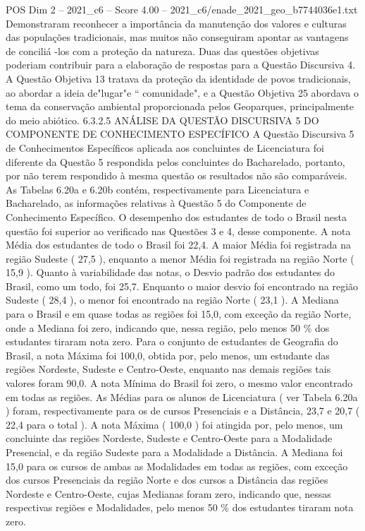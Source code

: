 \begin{textsample}{POS Dim 2 – 2021\_c6 – Score 4.00 – 2021\_c6/enade\_2021\_geo\_b7744036e1.txt}
Demonstraram reconhecer a importância da manutenção dos valores e culturas das populações tradicionais, mas muitos não conseguiram apontar as vantagens de conciliá -los com a proteção da natureza.
Duas das questões objetivas poderiam contribuir para a elaboração de respostas para a Questão Discursiva 4.
A Questão Objetiva 13 tratava da proteção da identidade de povos tradicionais, ao abordar a ideia de"lugar"e “ comunidade", e a Questão Objetiva 25 abordava o tema da conservação ambiental proporcionada pelos Geoparques, principalmente do meio abiótico. 6.3.2.5 ANÁLISE DA QUESTÃO DISCURSIVA 5 DO COMPONENTE DE CONHECIMENTO ESPECÍFICO A Questão Discursiva 5 de Conhecimentos Específicos aplicada aos concluintes de Licenciatura foi diferente da Questão 5 respondida pelos concluintes do Bacharelado, portanto, por não terem respondido à mesma questão os resultados não são comparáveis.
As Tabelas 6.20a e 6.20b contém, respectivamente para Licenciatura e Bacharelado, as informações relativas à Questão 5 do Componente de Conhecimento Específico.
O desempenho dos estudantes de todo o Brasil nesta questão foi superior ao verificado nas Questões 3 e 4, desse componente.
A nota Média dos estudantes de todo o Brasil foi 22,4.
A maior Média foi registrada na região Sudeste ( 27,5 ), enquanto a menor Média foi registrada na região Norte ( 15,9 ).
Quanto à variabilidade das notas, o Desvio padrão dos estudantes do Brasil, como um todo, foi 25,7.
Enquanto o maior desvio foi encontrado na região Sudeste ( 28,4 ), o menor foi encontrado na região Norte ( 23,1 ).
A Mediana para o Brasil e em quase todas as regiões foi 15,0, com exceção da região Norte, onde a Mediana foi zero, indicando que, nessa região, pelo menos 50 \% dos estudantes tiraram nota zero.
Para o conjunto de estudantes de Geografia do Brasil, a nota Máxima foi 100,0, obtida por, pelo menos, um estudante das regiões Nordeste, Sudeste e Centro-Oeste, enquanto nas demais regiões tais valores foram 90,0.
A nota Mínima do Brasil foi zero, o mesmo valor encontrado em todas as regiões.
As Médias para os alunos de Licenciatura ( ver Tabela 6.20a ) foram, respectivamente para os de cursos Presenciais e a Distância, 23,7 e 20,7 ( 22,4 para o total ).
A nota Máxima ( 100,0 ) foi atingida por, pelo menos, um concluinte das regiões Nordeste, Sudeste e Centro-Oeste para a Modalidade Presencial, e da região Sudeste para a Modalidade a Distância.
A Mediana foi 15,0 para os cursos de ambas as Modalidades em todas as regiões, com exceção dos cursos Presenciais da região Norte e dos cursos a Distância das regiões Nordeste e Centro-Oeste, cujas Medianas foram zero, indicando que, nessas respectivas regiões e Modalidades, pelo menos 50 \% dos estudantes tiraram nota zero.

\end{textsample}
